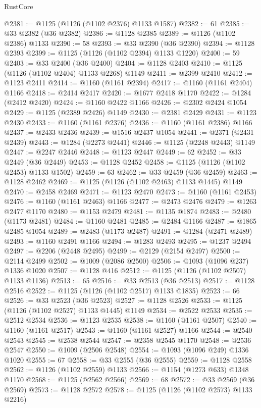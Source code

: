 \begin{lexlean}{RustCore}
\begin{coremodule}
@2381 := @1125 (@1126 (@1102 @2376) @1133 @1587)
@2382 := 61
@2385 := @33 @2382 (@36 @2382)
@2386 := @1128 @2385
@2389 := @1126 (@1102 @2386) @1133
@2390 := 58
@2393 := @33 @2390 (@36 @2390)
@2394 := @1128 @2393
@2399 := @1125 (@1126 (@1102 @2394) @1133 @1220)
@2400 := 59
@2403 := @33 @2400 (@36 @2400)
@2404 := @1128 @2403
@2410 := @1125 (@1126 (@1102 @2404) @1133 @2268) @1149
@2411 := @2399 @2410
@2412 := @1123 @2411
@2414 := @1160 (@1161 @2394)
@2417 := @1160 (@1161 @2404) @1166
@2418 := @2414 @2417
@2420 := @1677 @2418 @1170
@2422 := @1284 (@2412 @2420)
@2424 := @1160 @2422 @1166
@2426 := @2302 @2424 @1054
@2429 := @1125 (@2389 @2426) @1149
@2430 := @2381 @2429
@2431 := @1123 @2430
@2433 := @1160 (@1161 @2376)
@2436 := @1160 (@1161 @2386) @1166
@2437 := @2433 @2436
@2439 := @1516 @2437 @1054
@2441 := @2371 (@2431 @2439)
@2443 := @1284 (@2273 @2441)
@2446 := @1125 (@2248 @2443) @1149
@2447 := @2247 @2446
@2448 := @1123 @2447
@2449 := 62
@2452 := @33 @2449 (@36 @2449)
@2453 := @1128 @2452
@2458 := @1125 (@1126 (@1102 @2453) @1133 @1502)
@2459 := 63
@2462 := @33 @2459 (@36 @2459)
@2463 := @1128 @2462
@2469 := @1125 (@1126 (@1102 @2463) @1133 @1445) @1149
@2470 := @2458 @2469
@2471 := @1123 @2470
@2473 := @1160 (@1161 @2453)
@2476 := @1160 (@1161 @2463) @1166
@2477 := @2473 @2476
@2479 := @1263 @2477 @1170
@2480 := @1153 @2479
@2481 := @1135 @1874
@2483 := @2480 (@1173 @2481)
@2484 := @1160 @2481
@2485 := @2484 @1166
@2487 := @1865 @2485 @1054
@2489 := @2483 (@1173 @2487)
@2491 := @1284 (@2471 @2489)
@2493 := @1160 @2491 @1166
@2494 := @1283 @2493
@2495 := @1237 @2494
@2497 := @2206 (@2448 @2495)
@2499 := @2129 (@2154 @2497)
@2500 := @2114 @2499
@2502 := @1009 (@2086 @2500)
@2506 := @1093 (@1096 @237) @1336 @1020
@2507 := @1128 @416
@2512 := @1125 (@1126 (@1102 @2507) @1133 @1136)
@2513 := 65
@2516 := @33 @2513 (@36 @2513)
@2517 := @1128 @2516
@2522 := @1125 (@1126 (@1102 @2517) @1133 @1835)
@2523 := 66
@2526 := @33 @2523 (@36 @2523)
@2527 := @1128 @2526
@2533 := @1125 (@1126 (@1102 @2527) @1133 @1445) @1149
@2534 := @2522 @2533
@2535 := @2512 @2534
@2536 := @1123 @2535
@2538 := @1160 (@1161 @2507)
@2540 := @1160 (@1161 @2517)
@2543 := @1160 (@1161 @2527) @1166
@2544 := @2540 @2543
@2545 := @2538 @2544
@2547 := @2358 @2545 @1170
@2548 := @2536 @2547
@2550 := @1009 (@2506 @2548)
@2554 := @1093 (@1096 @249) @1336 @1020
@2555 := 67
@2558 := @33 @2555 (@36 @2555)
@2559 := @1128 @2558
@2562 := @1126 (@1102 @2559) @1133
@2566 := @1154 (@1273 @633) @1348 @1170
@2568 := @1125 (@2562 @2566)
@2569 := 68
@2572 := @33 @2569 (@36 @2569)
@2573 := @1128 @2572
@2578 := @1125 (@1126 (@1102 @2573) @1133 @2216)

\end{coremodule}
\end{lexlean}
